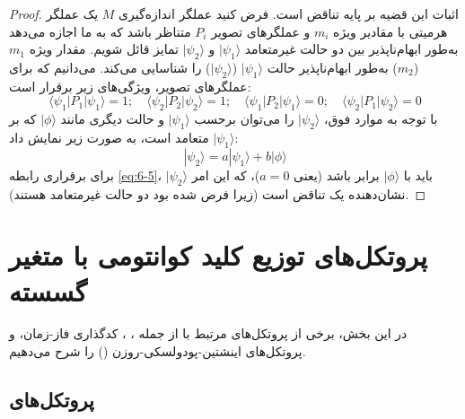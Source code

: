 \begin{proof}
	اثبات این قضیه بر پایه تناقض است. فرض کنید عملگر اندازه‌گیری $M$ یک عملگر هرمیتی با مقادیر ویژه $m_i$ و عملگرهای تصویر $P_i$ متناظر باشد که به ما اجازه می‌دهد به‌طور ابهام‌ناپذیر بین دو حالت غیرمتعامد $|\psi_1\rangle$ و $|\psi_2\rangle$ تمایز قائل شویم. مقدار ویژه $m_1$ ($m_2$) به‌طور ابهام‌ناپذیر حالت $|\psi_1\rangle$ ($|\psi_2\rangle$) را شناسایی می‌کند. می‌دانیم که برای عملگرهای تصویر، ویژگی‌های زیر برقرار است:
	\begin{equation}
		\langle\psi_1|P_1|\psi_1\rangle = 1; \quad \langle\psi_2|P_2|\psi_2\rangle = 1; \quad \langle\psi_1|P_2|\psi_1\rangle = 0; \quad \langle\psi_2|P_1|\psi_2\rangle = 0
		\label{eq:6-5}
	\end{equation}
	با توجه به موارد فوق، $|\psi_2\rangle$ را می‌توان برحسب $|\psi_1\rangle$ و حالت دیگری مانند $|\phi\rangle$ که بر $|\psi_1\rangle$ متعامد است، به صورت زیر نمایش داد:
	\begin{equation}
		|\psi_2\rangle = a|\psi_1\rangle + b|\phi\rangle
		\label{eq:6-6}
	\end{equation}
	برای برقراری رابطه \eqref{eq:6-5}، $|\psi_2\rangle$ باید با $|\phi\rangle$ برابر باشد (یعنی $a=0$)، که این امر نشان‌دهنده یک تناقض است (زیرا فرض شده بود دو حالت غیرمتعامد هستند).
\end{proof}





\section{پروتکل‌های توزیع کلید کوانتومی با متغیر گسسته}
\label{sec:6-4}

در این بخش، برخی از پروتکل‌های مرتبط با  از جمله ، ، کدگذاری فاز-زمان،  و پروتکل‌های اینشتین-پودولسکی-روزن () را شرح می‌دهیم.

\subsection{پروتکل‌های }
\label{subsec:6-4-1}

